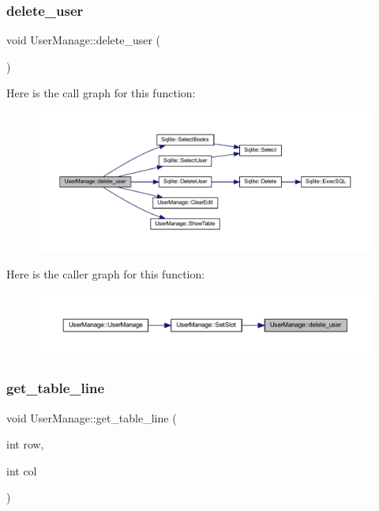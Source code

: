 \subsubsection{\texorpdfstring{delete\_user}{delete\_user}}
{\footnotesize\ttfamily void User\+Manage\+::delete\+\_\+user (\begin{DoxyParamCaption}{ }\end{DoxyParamCaption})\hspace{0.3cm}{\ttfamily [slot]}}

Here is the call graph for this function\+:
\nopagebreak
\begin{figure}[H]
\begin{center}
\leavevmode
\includegraphics[width=350pt]{class_user_manage_a254765c27c79b94370dd9f1e44551355_cgraph}
\end{center}
\end{figure}
Here is the caller graph for this function\+:
\nopagebreak
\begin{figure}[H]
\begin{center}
\leavevmode
\includegraphics[width=350pt]{class_user_manage_a254765c27c79b94370dd9f1e44551355_icgraph}
\end{center}
\end{figure}
\mbox{\label{class_user_manage_acf5b626b21868282ff4ad9dcccf8c765}} 
\subsubsection{\texorpdfstring{get\_table\_line}{get\_table\_line}}
{\footnotesize\ttfamily void User\+Manage\+::get\+\_\+table\+\_\+line (\begin{DoxyParamCaption}\item[{int}]{row,  }\item[{int}]{col }\end{DoxyParamCaption})\hspace{0.3cm}{\ttfamily [slot]}}

